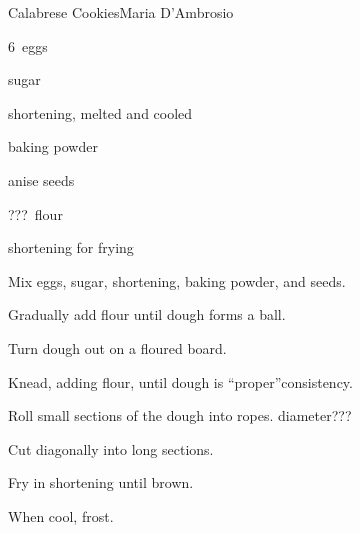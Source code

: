 \begin{recipe}{Calabrese Cookies\FIXME}{Maria D'Ambrosio}{}

\begin{ingredients}
\item 6~eggs
\item {} sugar
\item \C{\half} shortening, melted and cooled
\item {} baking powder
\item anise seeds
\item ???~flour
\item {} shortening for frying
\end{ingredients}

\begin{directions}
\item Mix eggs, sugar, shortening, baking powder, and seeds.
\item Gradually add flour until dough forms a ball.
\item Turn dough out on a floured board.
\item Knead, adding flour, until dough is ``proper''\FIXME consistency.
\item Roll small sections of the dough into ropes. diameter???
\item Cut diagonally into  long sections.
\item Fry in shortening until brown.
\item When cool, frost.
\end{directions}

\end{recipe}
